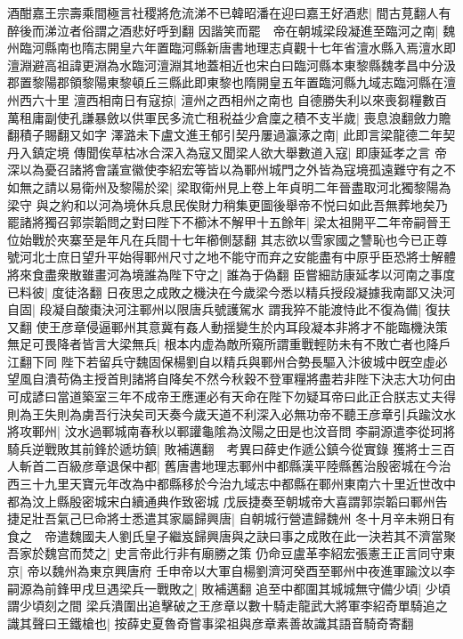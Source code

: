 酒酣嘉王宗壽乘間極言社稷將危流涕不已韓昭潘在迎曰嘉王好酒悲|{
	間古莧翻人有醉後而涕泣者俗謂之酒悲好呼到翻}
因諧笑而罷　帝在朝城梁段凝進至臨河之南|{
	魏州臨河縣南也隋志開皇六年置臨河縣新唐書地理志貞觀十七年省澶水縣入焉澶水即澶淵避高祖諱更淵為水臨河澶淵其地蓋相近也宋白曰臨河縣本東黎縣魏孝昌中分汲郡置黎陽郡領黎陽東黎頓丘三縣此即東黎也隋開皇五年置臨河縣九域志臨河縣在澶州西六十里}
澶西相南日有寇掠|{
	澶州之西相州之南也}
自德勝失利以來喪芻糧數百萬租庸副使孔謙暴斂以供軍民多流亡租税益少倉廩之積不支半歲|{
	喪息浪翻斂力贍翻積子賜翻又如字}
澤潞未下盧文進王郁引契丹屢過瀛涿之南|{
	此即言梁龍德二年契丹入鎮定境}
傳聞俟草枯冰合深入為寇又聞梁人欲大舉數道入寇|{
	即康延孝之言}
帝深以為憂召諸將會議宣徽使李紹宏等皆以為鄆州城門之外皆為寇境孤遠難守有之不如無之請以易衛州及黎陽於梁|{
	梁取衛州見上卷上年貞明二年晉盡取河北獨黎陽為梁守}
與之約和以河為境休兵息民俟財力稍集更圖後舉帝不悦曰如此吾無葬地矣乃罷諸將獨召郭崇韜問之對曰陛下不櫛沐不解甲十五餘年|{
	梁太祖開平二年帝嗣晉王位始戰於夾寨至是年凡在兵間十七年櫛側瑟翻}
其志欲以雪家國之讐恥也今已正尊號河北士庶日望升平始得鄆州尺寸之地不能守而弃之安能盡有中原乎臣恐將士解體將來食盡衆散雖畫河為境誰為陛下守之|{
	誰為于偽翻}
臣嘗細訪康延孝以河南之事度已料彼|{
	度徒洛翻}
日夜思之成敗之機決在今歲梁今悉以精兵授段凝據我南鄙又決河自固|{
	段凝自酸棗決河注鄆州以限唐兵號護駕水}
謂我猝不能渡恃此不復為備|{
	復扶又翻}
使王彦章侵逼鄆州其意冀有姦人動揺變生於内耳段凝本非將才不能臨機決策無足可畏降者皆言大梁無兵|{
	根本内虚為敵所窺所謂重戰輕防未有不敗亡者也降戶江翻下同}
陛下若留兵守魏固保楊劉自以精兵與鄆州合勢長驅入汴彼城中旣空虛必望風自潰苟偽主授首則諸將自降矣不然今秋穀不登軍糧將盡若非陛下決志大功何由可成諺曰當道築室三年不成帝王應運必有天命在陛下勿疑耳帝曰此正合朕志丈夫得則為王失則為虜吾行決矣司天奏今歲天道不利深入必無功帝不聽王彦章引兵踰汶水將攻鄆州|{
	汶水過鄆城南春秋以鄆讙龜隂為汶陽之田是也汶音問}
李嗣源遣李從珂將騎兵逆戰敗其前鋒於遞坊鎮|{
	敗補邁翻　考異曰薛史作遞公鎮今從實錄}
獲將士三百人斬首二百級彦章退保中都|{
	舊唐書地理志鄆州中都縣漢平陸縣舊治殷密城在今治西三十九里天寶元年改為中都縣移於今治九域志中都縣在鄆州東南六十里近世改中都為汶上縣殷密城宋白續通典作致密城}
戊辰捷奏至朝城帝大喜謂郭崇韜曰鄆州告捷足壯吾氣己巳命將士悉遣其家屬歸興唐|{
	自朝城行營遣歸魏州}
冬十月辛未朔日有食之　帝遣魏國夫人劉氏皇子繼岌歸興唐與之訣曰事之成敗在此一決若其不濟當聚吾家於魏宫而焚之|{
	史言帝此行非有廟勝之策}
仍命豆盧革李紹宏張憲王正言同守東京|{
	帝以魏州為東京興唐府}
壬申帝以大軍自楊劉濟河癸酉至鄆州中夜進軍踰汶以李嗣源為前鋒甲戌旦遇梁兵一戰敗之|{
	敗補邁翻}
追至中都圍其城城無守備少頃|{
	少頃謂少頃刻之間}
梁兵潰圍出追擊破之王彦章以數十騎走龍武大將軍李紹奇單騎追之識其聲曰王鐵槍也|{
	按薛史夏魯奇嘗事梁祖與彦章素善故識其語音騎奇寄翻}
